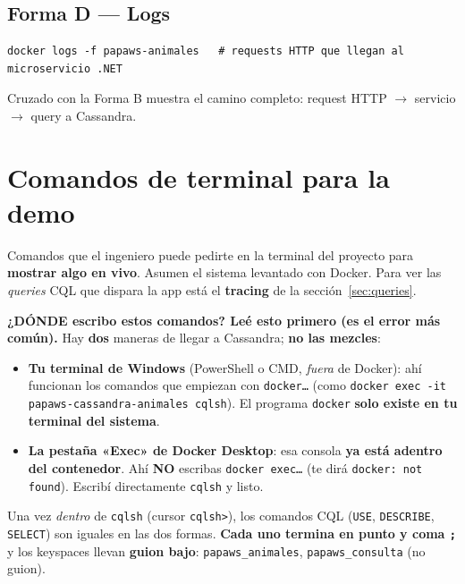 \documentclass[11pt,a4paper]{article}
\begin{document}
\subsection{Forma D — Logs}
\begin{lstlisting}[style=shell]
docker logs -f papaws-animales   # requests HTTP que llegan al microservicio .NET
\end{lstlisting}
\noindent Cruzado con la Forma B muestra el camino completo: request HTTP
$\rightarrow$ servicio $\rightarrow$ query a Cassandra.

\section{Comandos de terminal para la demo}
\label{sec:comandos}

Comandos que el ingeniero puede pedirte en la terminal del proyecto para
\textbf{mostrar algo en vivo}. Asumen el sistema levantado con Docker. Para ver las
\emph{queries} CQL que dispara la app está el \textbf{tracing} de la
sección~\ref{sec:queries}.

\begin{precision}
\textbf{¿DÓNDE escribo estos comandos? Leé esto primero (es el error más común).}
Hay \textbf{dos} maneras de llegar a Cassandra; \textbf{no las mezcles}:
\begin{itemize}[leftmargin=1.4em, nosep]
  \item \textbf{Tu terminal de Windows} (PowerShell o CMD, \emph{fuera} de Docker): ahí
        funcionan los comandos que empiezan con \texttt{docker\ldots} (como
        \texttt{docker exec -it papaws-cassandra-animales cqlsh}). El programa
        \texttt{docker} \textbf{solo existe en tu terminal del sistema}.
  \item \textbf{La pestaña «Exec» de Docker Desktop}: esa consola \textbf{ya está adentro
        del contenedor}. Ahí \textbf{NO} escribas \texttt{docker exec\ldots} (te dirá
        \texttt{docker: not found}). Escribí directamente \texttt{cqlsh} y listo.
\end{itemize}
Una vez \emph{dentro} de \texttt{cqlsh} (cursor \texttt{cqlsh>}), los comandos CQL
(\texttt{USE}, \texttt{DESCRIBE}, \texttt{SELECT}) son iguales en las dos formas.
\textbf{Cada uno termina en punto y coma \texttt{;}} y los keyspaces llevan
\textbf{guion bajo}: \texttt{papaws\_animales}, \texttt{papaws\_consulta} (no guion).
\end{precision}
\end{document}
